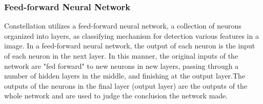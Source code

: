 \subsubsection{Feed-forward Neural Network}
Constellation utilizes a feed-forward neural network, a collection of neurons organized into layers, as classifying mechanism for detection various features in a image. In a feed-forward neural network, the output of each neuron is the input of each neuron in the next layer. In this manner, the original inputs of the network are "fed forward" to new neurons in new layers, passing through a number of hidden layers in the middle, and finishing at the output layer.The outputs of the neurons in the final layer (output layer) are the outputs of the whole network and are used to judge the conclusion the network made.